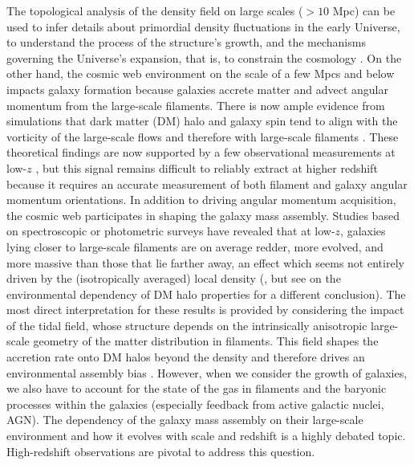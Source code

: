 \documentclass{aa}
\begin{document}
The topological analysis of the density field on large scales ($>10$ Mpc) can be used to infer details about primordial density fluctuations in the early Universe, to understand the process of the structure's growth, and the mechanisms governing the Universe's expansion, that is, to constrain the cosmology \citep[e.g.][]{park92,matsubara95,Zunckel2011,Wang2012,Codis2013,Codis2018,Appleby18}. On the other hand, the cosmic web environment on the scale of a few Mpcs and below impacts galaxy formation because galaxies accrete matter and advect angular momentum from the large-scale filaments. 
There is now ample evidence from simulations that dark matter (DM) halo and galaxy spin tend to align with the vorticity of the large-scale flows \citep[e.g.][]{libeskind13,laigle15,veena18} and therefore with large-scale filaments \citep[e.g.][]{AragonCalvo2007,codis12,Dubois2014,chen15}. These theoretical findings are now supported by a few observational measurements at low-$z$ \citep[e.g.][]{Tempel2013,zhang2015,hirv2017}, but this signal remains difficult to reliably extract at higher redshift because it requires an accurate measurement of both filament and galaxy angular momentum orientations.   
In addition to driving angular momentum acquisition, the cosmic web participates in shaping the galaxy mass assembly. Studies based on spectroscopic or photometric surveys have revealed that at low-$z$, galaxies lying closer to large-scale filaments are on average redder, more evolved, and more massive \citep{Rojas2004,Beygu2016,alpaslan16,Kuutma2017,Chen2017,Malavasi2017,Laigle2018,Kraljic2018} than those that lie farther away, an effect which seems not entirely driven by the (isotropically averaged) local density (\citealt{kraljic19}, but see \citealt{Goh2019} on the environmental dependency of DM halo properties for a different conclusion). The most direct interpretation for these results is provided by considering the impact of the tidal field, whose structure depends on the intrinsically anisotropic large-scale geometry of the matter distribution in filaments. This field shapes the accretion rate onto DM halos beyond the density \citep{Musso2018} and therefore drives an environmental assembly bias \citep[as has been described in][]{hahn2009}. However, when we consider the growth of galaxies, we also have to account for the state of the gas in filaments and the baryonic processes within the galaxies (especially feedback from active galactic nuclei, AGN). The dependency of the galaxy mass assembly on their large-scale environment and how it evolves with scale and redshift is a highly debated topic. High-redshift observations are pivotal to address this question.
\end{document}
